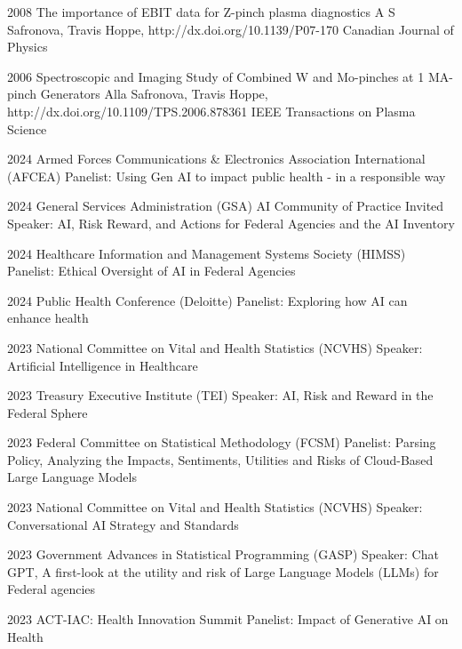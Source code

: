 \documentclass[]{scrartcl}
\begin{document}
\begin{cleanCV}
\Paper
{2008}
{The importance of EBIT data for Z-pinch plasma diagnostics}
{A S Safronova, Travis Hoppe, \etal}
{http://dx.doi.org/10.1139/P07-170}
{Canadian Journal of Physics}

\Paper
{2006}
{Spectroscopic and Imaging Study of Combined W and Mo-pinches 
  at 1 MA-pinch Generators}
{Alla Safronova, Travis Hoppe, \etal}
{http://dx.doi.org/10.1109/TPS.2006.878361}
{IEEE Transactions on Plasma Science}





\WorkExperienceX
{2024}
{Armed Forces Communications \& Electronics Association International (AFCEA)}
{Panelist: Using Gen AI to impact public health - in a responsible way}

\WorkExperienceX
{2024}
{General Services Administration (GSA) AI Community of Practice}
{Invited Speaker: AI, Risk Reward, and Actions for Federal Agencies and the AI Inventory}

\WorkExperienceX
{2024}
{Healthcare Information and Management Systems Society (HIMSS)}
{Panelist: Ethical Oversight of AI in Federal Agencies}

\WorkExperienceX
{2024}
{Public Health Conference (Deloitte)}
{Panelist: Exploring how AI can enhance health}

\WorkExperienceX
{2023}
{National Committee on Vital and Health Statistics (NCVHS)}
{Speaker: Artificial Intelligence in Healthcare}

\WorkExperienceX
{2023}
{Treasury Executive Institute (TEI)}
{Speaker: AI, Risk and Reward in the Federal Sphere}

\WorkExperienceX
{2023}
{Federal Committee on Statistical Methodology (FCSM)}
{Panelist: Parsing Policy, Analyzing the Impacts, Sentiments, Utilities and Risks of Cloud-Based Large Language Models}

\WorkExperienceX
{2023}
{National Committee on Vital and Health Statistics (NCVHS)}
{Speaker: Conversational AI Strategy and Standards}

\WorkExperienceX
{2023}
{Government Advances in Statistical Programming (GASP)}
{Speaker: Chat GPT, A first-look at the utility and risk of Large Language Models (LLMs) for Federal agencies}

\WorkExperienceX
{2023}
{ACT-IAC: Health Innovation Summit}
{Panelist: Impact of Generative AI on Health}


\end{cleanCV}
\end{document}
